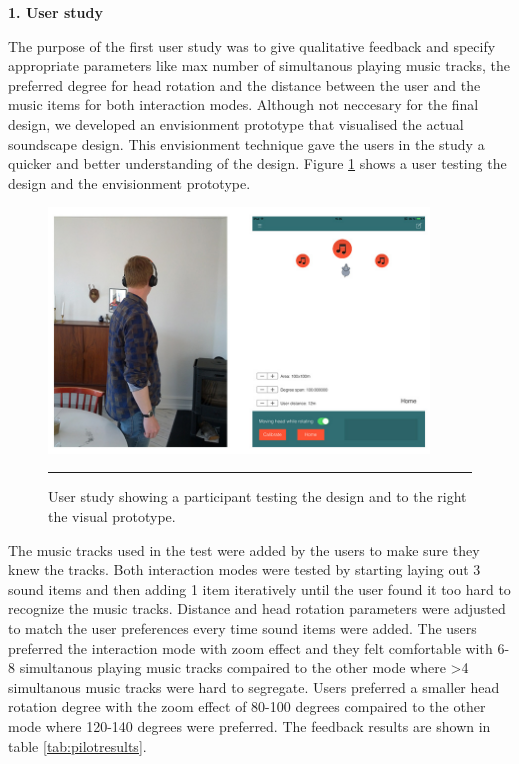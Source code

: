 \textbf{1. User study}

The purpose of the first user study was to give qualitative feedback and specify appropriate parameters like max number of simultanous playing music tracks, the preferred degree for head rotation and the distance between the user and the music items for both interaction modes. Although not neccesary for the final design, we developed an envisionment prototype \cite{benyon_designing_2010} that visualised the actual soundscape design. This envisionment technique gave the users in the study a quicker and better understanding of the design. Figure \ref{fig:pilotstudy} shows a user testing the design and the envisionment prototype.

\begin{figure}[b]
	\centering
		\includegraphics[width=0.9\textwidth,height=\textheight,keepaspectratio]{./Figures/pilotstudy.jpg}
		\rule{35em}{0.5pt}
	\caption[User study]{User study showing a participant testing the design and to the right the visual prototype.}
	\label{fig:pilotstudy}
\end{figure}

The music tracks used in the test were added by the users to make sure they knew the tracks. Both interaction modes were tested by starting laying out 3 sound items and then adding 1 item iteratively until the user found it too hard to recognize the music tracks. Distance and head rotation parameters were adjusted to match the user preferences every time sound items were added. The users preferred the interaction mode with zoom effect and they felt comfortable with 6-8 simultanous playing music tracks compaired to the other mode where \textgreater 4 simultanous music tracks were hard to segregate. Users preferred a smaller head rotation degree with the zoom effect of 80-100 degrees compaired to the other mode where 120-140 degrees were preferred. The feedback results are shown in table \ref{tab:pilotresults}.


